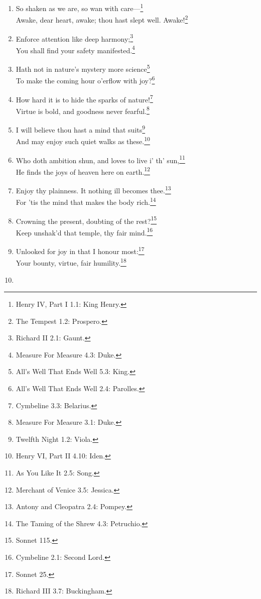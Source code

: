 \documentclass[17pt,twoside]{extarticle}
\begin{document}
\begin{enumerate}
  This bud of love, by summer's ripening breath---\footnote{Romeo and
    Juliet 2.2: Juliet.}\\Was it not to refresh the mind of
  man?\footnote{The Taming of the Shrew 3.1: Lucentio.}
\item
  So shaken as we are, so wan with care---\footnote{Henry IV, Part I
    1.1: King Henry.}\\Awake, dear heart, awake; thou hast slept well.
  Awake!\footnote{The Tempest 1.2: Prospero.}
\item
  Enforce attention like deep harmony;\footnote{Richard II 2.1: Gaunt.}\\You
  shall find your safety manifested.\footnote{Measure For Measure 4.3:
    Duke.}
\item
  Hath not in nature's mystery more science\footnote{All's Well That
    Ends Well 5.3: King.}\\To make the coming hour o'erflow with
  joy?\footnote{All's Well That Ends Well 2.4: Parolles.}
\item
  How hard it is to hide the sparks of nature!\footnote{Cymbeline 3.3:
    Belarius.}\\Virtue is bold, and goodness never fearful.\footnote{Measure
    For Measure 3.1: Duke.}
\item
  I will believe thou hast a mind that suits\footnote{Twelfth Night 1.2:
    Viola.}\\And may enjoy such quiet walks as these.\footnote{Henry VI,
    Part II 4.10: Iden.}
\item
  Who doth ambition shun, and loves to live i' th' sun,\footnote{As You
    Like It 2.5: Song.}\\He finds the joys of heaven here on
  earth.\footnote{Merchant of Venice 3.5: Jessica.}
\item
  Enjoy thy plainness. It nothing ill becomes thee.\footnote{Antony and
    Cleopatra 2.4: Pompey.}\\For 'tis the mind that makes the body
  rich.\footnote{The Taming of the Shrew 4.3: Petruchio.}
\item
  Crowning the present, doubting of the rest?\footnote{Sonnet 115.}\\Keep
  unshak'd that temple, thy fair mind.\footnote{Cymbeline 2.1: Second
    Lord.}
\item
  Unlooked for joy in that I honour most:\footnote{Sonnet 25.}\\Your
  bounty, virtue, fair humility.\footnote{Richard III 3.7: Buckingham.}
\item

\end{enumerate}
\end{document}
